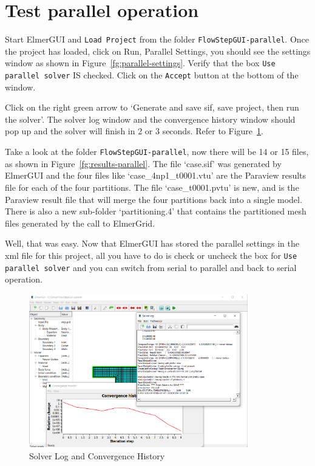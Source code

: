 \section{Test parallel operation}

Start ElmerGUI and \texttt{Load Project} from the folder \texttt{FlowStepGUI-parallel}.  Once the project has loaded, click on Run, Parallel Settings, you should see the settings window as shown in Figure~\ref{fg:parallel-settings}.  Verify that the box \texttt{Use parallel solver} IS checked.  Click on the \texttt{Accept} button at the bottom of the window.

Click on the right green arrow to `Generate and save sif, save project,  then run the solver'.  The solver log window and the convergence history window should pop up and the solver will finish in 2 or 3 seconds.  Refer to Figure~\ref{fg:solver-parallel}.

Take a look at the folder \texttt{FlowStepGUI-parallel}, now there will be 14 or 15 files, as shown in Figure~\ref{fg:results-parallel}.  The file `case.sif' was generated by ElmerGUI and the four files like `case\_4np1\_t0001.vtu' are the Paraview results file for each of the four partitions.  The file `case\_t0001.pvtu' is new, and is the Paraview result file that will merge the four partitions back into a single model.  There is also a new sub-folder `partitioning.4' that contains the partitioned mesh files generated by the call to ElmerGrid.

Well, that was easy.  Now that ElmerGUI has stored the parallel settings in the xml file for this project, all you have to do is check or uncheck the box for \texttt{Use parallel solver} and you can switch from serial to parallel and back to serial operation. 

\begin{figure}[H]
\centering
\includegraphics[width=0.85\textwidth]{parallel-10}
\caption{Solver Log and Convergence History}\label{fg:solver-parallel}
\end{figure}

